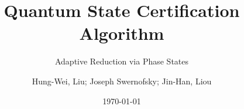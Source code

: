 \documentclass[10pt, aspectratio=169]{beamer}
\title[Quantum State Certification]{Quantum State Certification Algorithm}
\subtitle{Adaptive Reduction via Phase States}
\author{Hung-Wei, Liu; Joseph Swernofsky; Jin-Han, Liou}
\date{\today}
\begin{document}
\frame{\titlepage}





\end{document}
